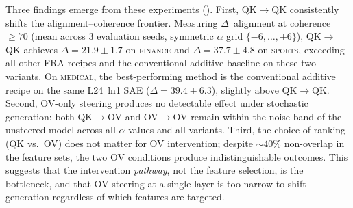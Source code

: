 \documentclass{article} %
\theoremstyle{plain}
\theoremstyle{definition}
\theoremstyle{remark}
\begin{document}
Three findings emerge from these experiments (). First, QK$\to$QK consistently shifts the alignment--coherence frontier. Measuring $\Delta$~alignment at coherence $\geq 70$ (mean across 3 evaluation seeds, symmetric $\alpha$ grid $\{-6,\ldots,+6\}$), QK$\to$QK achieves $\Delta = 21.9 \pm 1.7$ on \textsc{finance} and $\Delta = 37.7 \pm 4.8$ on \textsc{sports}, exceeding all other FRA recipes and the conventional additive baseline on these two variants. On \textsc{medical}, the best-performing method is the conventional additive recipe on the same L24~ln1 SAE ($\Delta = 39.4 \pm 6.3$), slightly above QK$\to$QK. Second, OV-only steering produces no detectable effect under stochastic generation: both QK$\to$OV and OV$\to$OV remain within the noise band of the unsteered model across all $\alpha$ values and all variants. Third, the choice of ranking (QK vs.\ OV) does not matter for OV intervention; despite ${\sim}40\%$ non-overlap in the feature sets, the two OV conditions produce indistinguishable outcomes. This suggests that the intervention \emph{pathway}, not the feature selection, is the bottleneck, and that OV steering at a single layer is too narrow to shift generation regardless of which features are targeted.




\end{document}

